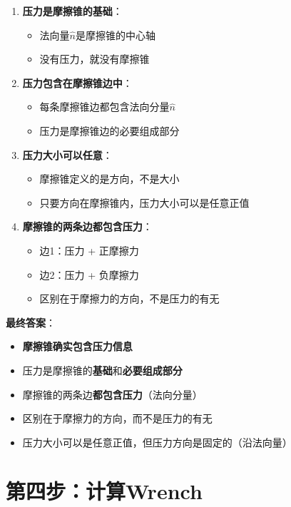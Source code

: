 \documentclass[12pt,a4paper]{article}
\begin{document}
\begin{enumerate}
\item \textbf{压力是摩擦锥的基础}：
   \begin{itemize}
   \item 法向量$\hat{n}$是摩擦锥的中心轴
   \item 没有压力，就没有摩擦锥
   \end{itemize}

\item \textbf{压力包含在摩擦锥边中}：
   \begin{itemize}
   \item 每条摩擦锥边都包含法向分量$\hat{n}$
   \item 压力是摩擦锥边的必要组成部分
   \end{itemize}

\item \textbf{压力大小可以任意}：
   \begin{itemize}
   \item 摩擦锥定义的是方向，不是大小
   \item 只要方向在摩擦锥内，压力大小可以是任意正值
   \end{itemize}

\item \textbf{摩擦锥的两条边都包含压力}：
   \begin{itemize}
   \item 边1：压力 + 正摩擦力
   \item 边2：压力 + 负摩擦力
   \item 区别在于摩擦力的方向，不是压力的有无
   \end{itemize}
\end{enumerate}

\textbf{最终答案}：

\begin{itemize}
\item \textbf{摩擦锥确实包含压力信息}
\item 压力是摩擦锥的\textbf{基础}和\textbf{必要组成部分}
\item 摩擦锥的两条边\textbf{都包含压力}（法向分量）
\item 区别在于摩擦力的方向，而不是压力的有无
\item 压力大小可以是任意正值，但压力方向是固定的（沿法向量）
\end{itemize}

\section{第四步：计算Wrench}
\end{document}

